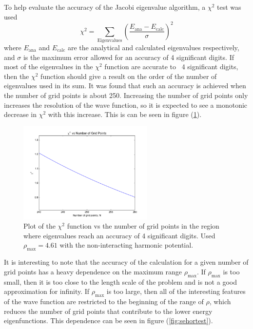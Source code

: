 \documentclass[a4paper,12pt]{report}
\begin{document}
To help evaluate the accuracy of the Jacobi eigenvalue algorithm, a $\chi^2$ test was used
\begin{equation}
 \chi^2 = \sum_{\mathrm{Eigenvalues}}\left(\frac{E_{\mathrm{ana}} - E_{\mathrm{calc}}}{\sigma}\right)^2
\end{equation}
where $E_{\mathrm{ana}}$ and $E_{\mathrm{calc}}$ are the analytical and calculated eigenvalues respectively, and $\sigma$ is the maximum error allowed for an accuracy of 4 significant digits. If most of the eigenvalues in the $\chi^2$ function are accurate to ~4 significant digits, then the $\chi^2$ function should give a result on the order of the number of eigenvalues used in its sum. It was found that such an accuracy is achieved when the number of grid points is about 250. Increasing the number of grid points only increases the resolution of the wave function, so it is expected to see a monotonic decrease in $\chi^2$ with this increase. This is can be seen in figure (\ref{fig:sehontest}). 

\begin{figure}
\centering
 \includegraphics[width=0.6\textwidth]{SeHoNtest.png}
 \caption{Plot of the $\chi^2$ function vs the number of grid points in the region where eigenvalues reach an accuracy of 4 significant digits. Used $\rho_{\mathrm{max}} = 4.61$ with the non-interacting harmonic potential.}
 \label{fig:sehontest}
\end{figure}

It is interesting to note that the accuracy of the calculation for a given number of grid points has a heavy dependence on the maximum range $\rho_{\mathrm{max}}$. If $\rho_{\mathrm{max}}$ is too small, then it is too close to the length scale of the problem and is not a good approximation for infinity. If $\rho_{\mathrm{max}}$ is too large, then all of the interesting features of the wave function are restricted to the beginning of the range of $\rho$, which reduces the number of grid points that contribute to the lower energy eigenfunctions. This dependence can be seen in figure (\ref{fig:sehortest}).
\end{document}
